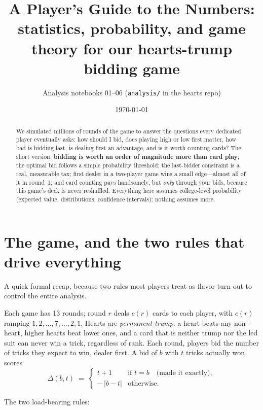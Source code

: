 \documentclass[11pt]{article}
\title{A Player's Guide to the Numbers:\\
\large statistics, probability, and game theory for our hearts-trump bidding game}
\author{Analysis notebooks 01--06 (\texttt{analysis/} in the hearts repo)}
\date{\today}
\begin{document}
\maketitle

\begin{abstract}
\noindent
We simulated millions of rounds of the game to answer the questions every
dedicated player eventually asks: how should I bid, does playing high or low
first matter, how bad is bidding last, is dealing first an advantage, and is
it worth counting cards? The short version: \textbf{bidding is worth an order
of magnitude more than card play}; the optimal bid follows a simple
probability threshold; the last-bidder constraint is a real, measurable tax;
first dealer in a two-player game wins a small edge---almost all of it in
round~1; and card counting pays handsomely, but \emph{only} through your
bids, because this game's deck is never reshuffled. Everything here assumes
college-level probability (expected value, distributions, confidence
intervals); nothing assumes more.
\end{abstract}

\tableofcontents

\section{The game, and the two rules that drive everything}
\label{sec:rules}

A quick formal recap, because two rules most players treat as flavor turn out
to control the entire analysis.

Each game has 13 rounds; round $r$ deals $c(r)$ cards to each player, with
$c(r)$ ramping $1,2,\dots,7,\dots,2,1$. Hearts are \emph{permanent trump}:
a heart beats any non-heart, higher hearts beat lower ones, and a card that
is neither trump nor the led suit can never win a trick, regardless of rank.
Each round, players bid the number of tricks they expect to win, dealer
first. A bid of $b$ with $t$ tricks actually won scores
\begin{equation}
\Delta(b, t) \;=\;
\begin{cases}
t + 1 & \text{if } t = b \quad\text{(made it exactly)},\\
-\,|b - t| & \text{otherwise.}
\end{cases}
\label{eq:score}
\end{equation}

The two load-bearing rules:
\end{document}

